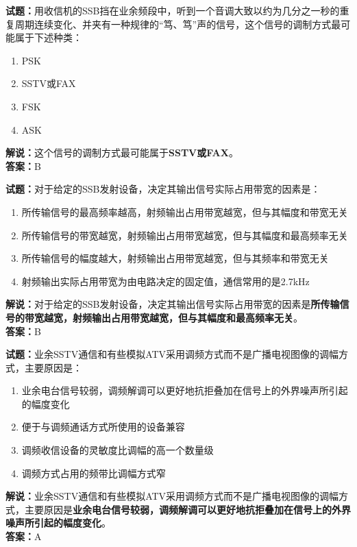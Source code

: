 \documentclass{ctexbook}
\begin{document}
\vspace{1em}

\textbf{试题：}用收信机的SSB挡在业余频段中，听到一个音调大致以约为几分之一秒的重复周期连续变化、并夹有一种规律的“笃、笃”声的信号，这个信号的调制方式最可能属于下述种类：
\begin{enumerate}[leftmargin=3em]
  \item PSK
  \item SSTV或FAX
  \item FSK
  \item ASK
\end{enumerate}
\noindent\textbf{解说：}这个信号的调制方式最可能属于\textbf{SSTV或FAX}。\\\noindent\textbf{答案：}B

\vspace{1em}

\textbf{试题：}对于给定的SSB发射设备，决定其输出信号实际占用带宽的因素是：
\begin{enumerate}[leftmargin=3em]
  \item 所传输信号的最高频率越高，射频输出占用带宽越宽，但与其幅度和带宽无关
  \item 所传输信号的带宽越宽，射频输出占用带宽越宽，但与其幅度和最高频率无关
  \item 所传输信号的幅度越大，射频输出占用带宽越宽，但与其频率和带宽无关
  \item 射频输出实际占用带宽为由电路决定的固定值，通信常用的是2.7\unit{\kHz}
\end{enumerate}
\noindent\textbf{解说：}对于给定的SSB发射设备，决定其输出信号实际占用带宽的因素是\textbf{所传输信号的带宽越宽，射频输出占用带宽越宽，但与其幅度和最高频率无关}。\\\noindent\textbf{答案：}B

\vspace{1em}

\textbf{试题：}业余SSTV通信和有些模拟ATV采用调频方式而不是广播电视图像的调幅方式，主要原因是：
\begin{enumerate}[leftmargin=3em]
  \item 业余电台信号较弱，调频解调可以更好地抗拒叠加在信号上的外界噪声所引起的幅度变化
  \item 便于与调频通话方式所使用的设备兼容
  \item 调频收信设备的灵敏度比调幅的高一个数量级
  \item 调频方式占用的频带比调幅方式窄
\end{enumerate}
\noindent\textbf{解说：}业余SSTV通信和有些模拟ATV采用调频方式而不是广播电视图像的调幅方式，主要原因是\textbf{业余电台信号较弱，调频解调可以更好地抗拒叠加在信号上的外界噪声所引起的幅度变化}。\\\noindent\textbf{答案：}A
\end{document}
